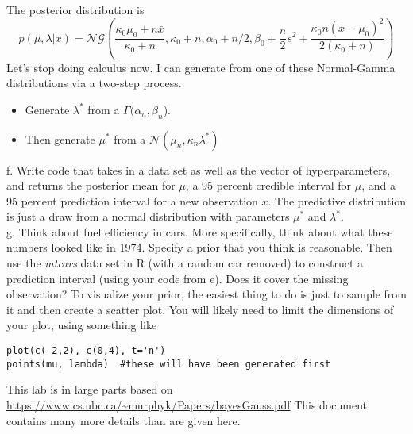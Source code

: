 \documentclass{article}
\begin{document}
The posterior distribution is 
$$p(\mu, \lambda|x)=\mathcal{NG}(\frac{\kappa_0\mu_0+n\bar{x}}{\kappa_0+n}, \kappa_0+n, \alpha_0+n/2, \beta_0+\frac{n}{2}s^2+\frac{\kappa_0n(\bar{x}-\mu_0)^2}{2(\kappa_0+n)})$$
Let's stop doing calculus now. I can generate from one of these Normal-Gamma distributions via a two-step process.  
\begin{itemize}
\item Generate $\lambda^*$ from a $\Gamma(\alpha_n, \beta_n$). 
\item Then generate $\mu^*$ from a $\mathcal{N}(\mu_n, \kappa_n\lambda^*)$
\end{itemize}
f.  Write code that takes in a data set as well as the vector of hyperparameters, and returns the posterior mean for $\mu$, a 95 percent credible interval for $\mu$, and a 95 percent prediction interval for a new observation $x$.   The predictive distribution is just a draw from a normal distribution with parameters $\mu^*$ and $\lambda^*$.\\[10pt]
g.  Think about fuel efficiency in cars. More specifically, think about what these numbers looked like in 1974.  Specify a prior that you think is reasonable.  Then use the {\it mtcars} data set in R (with a random car removed) to construct a prediction interval (using your code from e).  Does it cover the missing observation?  To visualize your prior, the easiest thing to do is just to sample from it and then create a scatter plot.  You will likely need to limit the dimensions of your plot, using something like
\begin{verbatim}
plot(c(-2,2), c(0,4), t='n')
points(mu, lambda)  #these will have been generated first
\end{verbatim} 
\vspace{.5in}This lab is in large parts based on \url{https://www.cs.ubc.ca/~murphyk/Papers/bayesGauss.pdf}  This document contains many more details than are given here. 
\end{document}
